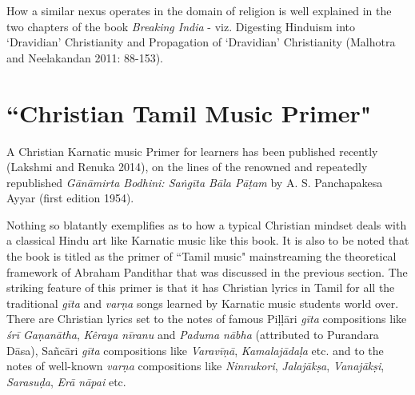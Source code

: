How a similar nexus operates in the domain of religion is well explained in the two chapters of the book \textit{Breaking India} - viz. Digesting Hinduism into `Dravidian' Christianity and Propagation of `Dravidian' Christianity (Malhotra and Neelakandan 2011: 88-153).

\newpage

\section*{``Christian Tamil Music Primer"}

A Christian Karnatic music Primer for learners has been published recently (Lakshmi and Renuka 2014), on the lines of the renowned and repeatedly republished \textit{Gānāmirta Bodhini: Saṅgīta Bāla Pāṭ­am} by A. S. Panchapakesa Ayyar (first edition 1954).

Nothing so blatantly exemplifies as to how a typical Christian mindset deals with a classical Hindu art like Karnatic music like this book. It is also to be noted that the book is titled as the primer of ``Tamil music" mainstreaming the theoretical framework of Abraham Pandithar that was discussed in the previous section. The striking feature of this primer is that it has Christian lyrics in Tamil for all the traditional \textit{gīta} and \textit{varṇa} songs learned by Karnatic music students world over. There are Christian lyrics set to the notes of famous Piḷḷāri \textit{gīta} compositions like \textit{śrī Gaṇanātha}, \textit{Kêraya nīranu} and \textit{Paduma nābha }(attributed to Purandara Dāsa), Sañcāri \textit{gīta} compositions like \textit{Varavīṇā}, \textit{Kamalajādaḷa} etc. and to the notes of well-known \textit{varṇa} compositions like \textit{Ninnukori}, \textit{Jalajākṣa}, \textit{Vanajākṣi}, \textit{Sarasuḍa}, \textit{Erā nāpai} etc.

